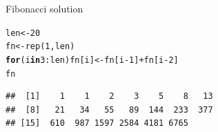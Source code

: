 \documentclass[xcolor=table,       handout,    xcolor=dvipsnames]{beamer}\usepackage[]{graphicx}\usepackage[]{color}
\makeatletter
\newcommand{\hlnum}[1]{\textcolor[rgb]{0,0,0}{#1}}
\newcommand{\hlopt}[1]{\textcolor[rgb]{0,0,0}{#1}}
\newcommand{\hlstd}[1]{\textcolor[rgb]{0,0,0}{#1}}
\newcommand{\hlkwa}[1]{\textcolor[rgb]{1,0,0}{\textbf{#1}}}
\newcommand{\hlkwb}[1]{\textcolor[rgb]{0,0,0}{#1}}
\newcommand{\hlkwd}[1]{\textcolor[rgb]{0,0,1}{#1}}
\newenvironment{kframe}{%
 \def\at@end@of@kframe{}%
 \ifinner\ifhmode%
  \def\at@end@of@kframe{\end{minipage}}%
  \begin{minipage}{\columnwidth}%
 \fi\fi%
 \def\FrameCommand##1{\hskip\@totalleftmargin \hskip-\fboxsep
 \colorbox{shadecolor}{##1}\hskip-\fboxsep
     \hskip-\linewidth \hskip-\@totalleftmargin \hskip\columnwidth}%
 \MakeFramed {\advance\hsize-\width
   \@totalleftmargin\z@ \linewidth\hsize
   \@setminipage}}%
 {\par\unskip\endMakeFramed%
 \at@end@of@kframe}
\newenvironment{knitrout}{}{} %
\makeatother
\begin{document}

\begin{frame}[fragile]{Fibonacci solution}
\begin{knitrout}
\color{fgcolor}\begin{kframe}
\begin{alltt}
\hlstd{len} \hlkwb{<-} \hlnum{20}
\hlstd{fn} \hlkwb{<-} \hlkwd{rep}\hlstd{(}\hlnum{1}\hlstd{, len)}
\hlkwa{for}\hlstd{(i} \hlkwa{in} \hlnum{3}\hlopt{:}\hlstd{len)  fn[i]} \hlkwb{<-} \hlstd{fn[i}\hlopt{-}\hlnum{1}\hlstd{]} \hlopt{+} \hlstd{fn[i}\hlopt{-}\hlnum{2}\hlstd{]}
\hlstd{fn}
\end{alltt}
\begin{verbatim}
##  [1]    1    1    2    3    5    8   13
##  [8]   21   34   55   89  144  233  377
## [15]  610  987 1597 2584 4181 6765
\end{verbatim}
\end{kframe}
\end{knitrout}
\end{frame}

\end{document}
